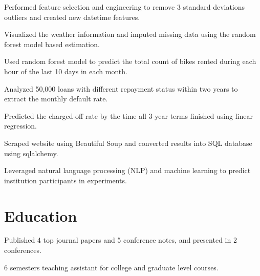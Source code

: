 \documentclass[letterpaper]{deedy-resume-openfont}
\begin{document}
\location{}
\begin{tightemize}
\item Performed feature selection and engineering to remove 3 standard deviations outliers and created new datetime features.
\item Visualized the weather information and imputed missing data using the random forest model based estimation.
\item Used random forest model to predict the total count of bikes rented during each hour of the last 10 days in each month.
\end{tightemize}
\sectionsep

\location{}
\begin{tightemize}
\item Analyzed 50,000 loans with different repayment status within two years to extract the monthly default rate.
\item Predicted the charged-off rate by the time all 3-year terms finished using linear regression.
\end{tightemize}
\sectionsep

\location{}
\begin{tightemize}
\item Scraped website using Beautiful Soup and converted results into SQL database using sqlalchemy.
\item Leveraged natural language processing (NLP) and machine learning to predict institution participants in experiments.
\end{tightemize}
\sectionsep


\section{Education} 

\begin{tightemize}
\item Published 4 top journal papers and 5 conference notes, and presented in 2 conferences.
\item 6 semesters teaching assistant for college and graduate level courses.
\end{tightemize}
\sectionsep
\end{document}
